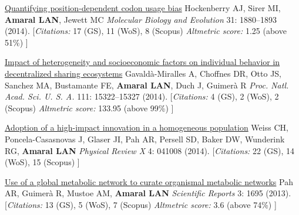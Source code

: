 \NumberedItem{\makebox[0.8cm][r]{[106]}}
\href{/people/amaral/quantifying-position-dependent-codon-usage-bias}
{Quantifying position-dependent codon usage bias}
\newline
Hockenberry AJ, Sirer MI, {\textbf{Amaral LAN}}, Jewett MC
\newline
\textit{Molecular Biology and Evolution}
    31:
1880--1893 (2014).
    \newline
    \hfill [{\em{Citations:}} 17 (GS),
    11 (WoS), 8 (Scopus)
        {\hspace*{1cm} \em{Altmetric score:}}  1.25 (above 51\%)
    ]
\newline
\Gap
~
\Gap

\NumberedItem{\makebox[0.8cm][r]{[105]}}
\href{/people/amaral/impact-heterogeneity-and-socioeconomic-factors-individual-behavior-decentralized-sharing-ecosystems}
{Impact of heterogeneity and socioeconomic factors on individual behavior in decentralized sharing ecosystems}
\newline
Gavald\`a-Miralles A, Choffnes DR, Otto JS, Sanchez MA, Bustamante FE, {\textbf{Amaral LAN}}, Duch J, Guimer\`a R
\newline
\textit{Proc. Natl. Acad. Sci. U. S. A.}
    111:
15322--15327 (2014).
    \newline
    \hfill [{\em{Citations:}} 4 (GS),
    2 (WoS), 2 (Scopus)
        {\hspace*{1cm} \em{Altmetric score:}}  133.95 (above 99\%)
    ]
\newline
\Gap
~
\Gap

\NumberedItem{\makebox[0.8cm][r]{[104]}}
\href{/people/amaral/adoption-high-impact-innovation-homogeneous-population}
{Adoption of a high-impact innovation in a homogeneous population}
\newline
Weiss CH, Poncela-Casasnovas J, Glaser JI, Pah AR, Persell SD, Baker DW, Wunderink RG, {\textbf{Amaral LAN}}
\newline
\textit{Physical Review X}
    4:
041008 (2014).
    \newline
    \hfill [{\em{Citations:}} 22 (GS),
    14 (WoS), 15 (Scopus)
    ]
\newline
\Gap
~
\Gap

\NumberedItem{\makebox[0.8cm][r]{[103]}}
\href{/people/amaral/use-global-metabolic-network-predict-organismal-metabolic-networks}
{Use of a global metabolic network to curate organismal metabolic networks}
\newline
Pah AR, Guimer\`a R, Mustoe AM, {\textbf{Amaral LAN}}
\newline
\textit{Scientific Reports}
    3:
1695 (2013).
    \newline
    \hfill [{\em{Citations:}} 13 (GS),
    5 (WoS), 7 (Scopus)
        {\hspace*{1cm} \em{Altmetric score:}}  3.6 (above 74\%)
    ]
\newline
\Gap
~
\Gap

